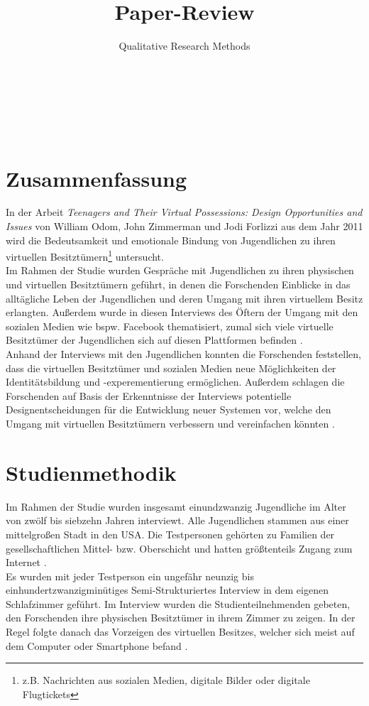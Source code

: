 \documentclass{hsflensburg}
\title{Paper-Review}
\subtitle{Qualitative Research Methods}
\author{
	\name{Tom Hartelt}\\
	\institution{Hochschule Flensburg}
	\and
	\name{Martin Hermannsen}\\
	\institution{Hochschule Flensburg}
	\and
	\name{Michael Frank}\\
	\institution{Hochschule Flensburg}
}
\begin{document}
	\maketitle
 	 \tableofcontents

  \pagebreak
	
	\section{Zusammenfassung}
	In der Arbeit \textit{Teenagers and Their Virtual Possessions: Design Opportunities and Issues} von
 	William Odom, John Zimmerman und Jodi Forlizzi aus dem Jahr 2011 wird die Bedeutsamkeit 
	und emotionale Bindung von Jugendlichen zu ihren virtuellen Besitztümern\footnote{ z.B. Nachrichten aus sozialen Medien, digitale Bilder oder digitale Flugtickets} untersucht.\\
	Im Rahmen der Studie wurden Gespräche mit  Jugendlichen zu ihren physischen und virtuellen Besitztümern 	geführt, in denen die Forschenden Einblicke in das alltägliche Leben der 
	Jugendlichen und deren Umgang mit ihren virtuellem Besitz erlangten. Außerdem wurde
	 in diesen Interviews des Öftern der Umgang mit den sozialen Medien wie bspw. Facebook thematisiert, zumal sich viele virtuelle Besitztümer der Jugendlichen sich auf diesen Plattformen befinden 
	\cite{odom2011teenagers}. \\

	Anhand der Interviews mit den Jugendlichen konnten die Forschenden feststellen, dass die 
	virtuellen Besitztümer und sozialen Medien neue Möglichkeiten der Identitätsbildung 
	und -experementierung ermöglichen. Außerdem schlagen die Forschenden auf Basis der 
	Erkenntnisse der Interviews potentielle Designentscheidungen für die 
	Entwicklung neuer Systemen vor, welche den Umgang mit virtuellen 
	Besitztümern verbessern und vereinfachen könnten \cite{odom2011teenagers}. 


	\section{Studienmethodik}
	Im Rahmen der Studie  wurden insgesamt einundzwanzig Jugendliche im Alter
	von zwölf bis siebzehn Jahren interviewt. Alle Jugendlichen stammen
	aus einer mittelgroßen Stadt in den USA. Die Testpersonen gehörten zu Familien
	der gesellschaftlichen Mittel- bzw. Oberschicht und hatten größtenteils Zugang 
	zum Internet \cite{odom2011teenagers}. \\

	Es wurden mit jeder Testperson ein ungefähr neunzig bis einhundertzwanzigminütiges
	Semi-Strukturiertes Interview in dem eigenen Schlafzimmer geführt. Im Interview
	wurden die Studienteilnehmenden gebeten, den Forschenden ihre physischen Besitztümer
	in ihrem Zimmer zu zeigen. In der Regel folgte danach das Vorzeigen des
	virtuellen Besitzes, welcher sich meist auf dem Computer oder Smartphone befand 
	\cite{odom2011teenagers}. \\
\end{document}
